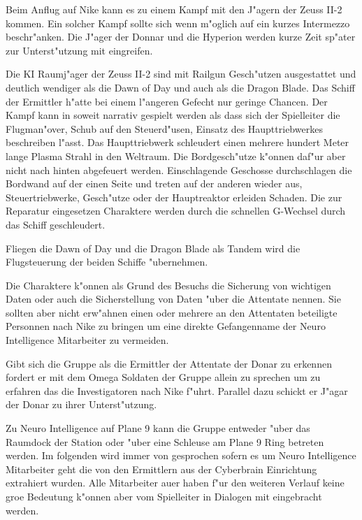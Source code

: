 \begin{remarks}
	Beim Anflug auf Nike kann es zu einem Kampf mit den J"agern der Zeuss II-2 kommen. Ein solcher Kampf sollte sich wenn m"oglich auf ein kurzes Intermezzo beschr"anken. Die J"ager der Donnar und die Hyperion werden kurze Zeit sp"ater zur Unterst"utzung mit eingreifen. 
	
	Die KI Raumj"ager der Zeuss II-2 sind mit Railgun Gesch"utzen ausgestattet und deutlich wendiger als die Dawn of Day und auch als die Dragon Blade. Das Schiff der Ermittler h"atte bei einem l"angeren Gefecht nur geringe Chancen. Der Kampf kann in soweit narrativ gespielt werden als dass sich der Spielleiter die Flugman"over, Schub auf den Steuerd"usen, Einsatz des Haupttriebwerkes beschreiben l"asst. Das Haupttriebwerk schleudert einen mehrere hundert Meter lange Plasma Strahl in den Weltraum. Die Bordgesch"utze k"onnen daf"ur aber nicht nach hinten abgefeuert werden. Einschlagende Geschosse durchschlagen die Bordwand auf der einen Seite und treten auf der anderen wieder aus, Steuertriebwerke, Gesch"utze oder der Hauptreaktor erleiden Schaden. Die zur Reparatur eingesetzen Charaktere werden durch die schnellen G-Wechsel durch das Schiff geschleudert.

	Fliegen die Dawn of Day und die Dragon Blade als Tandem wird \xl{} die Flugsteuerung der beiden Schiffe "ubernehmen.

	Die Charaktere k"onnen als Grund des Besuchs die Sicherung von wichtigen Daten oder auch die Sicherstellung von Daten "uber die Attentate nennen. Sie sollten aber nicht erw"ahnen einen oder mehrere an den Attentaten beteiligte Personnen nach Nike zu bringen um eine direkte Gefangenname der Neuro Intelligence Mitarbeiter zu vermeiden.

	Gibt sich die Gruppe als die Ermittler der Attentate der Donar zu erkennen fordert er mit dem Omega Soldaten der Gruppe allein zu sprechen um zu erfahren das die Investigatoren nach Nike f"uhrt. Parallel dazu schickt er J"agar der Donar zu ihrer Unterst"utzung.
\end{remarks}


Zu Neuro Intelligence auf Plane 9 kann die Gruppe entweder "uber das Raumdock der Station oder "uber eine Schleuse am Plane 9 Ring betreten werden. Im folgenden wird immer von \ml{} gesprochen sofern es um Neuro Intelligence Mitarbeiter geht die von den Ermittlern aus der Cyberbrain Einrichtung extrahiert wurden. Alle Mitarbeiter au\3er \ml{} haben f"ur den weiteren Verlauf keine gro\3e Bedeutung k"onnen aber vom Spielleiter in Dialogen mit eingebracht werden.

